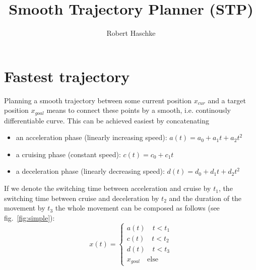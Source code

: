 \documentclass[11pt,english]{article}
\newcommand{\xc}{x_{cur}}
\newcommand{\xg}{x_{goal}}
\begin{document}
\title{Smooth Trajectory Planner (STP)}
\author{Robert Haschke}
\maketitle

\section{Fastest trajectory}
Planning a smooth trajectory between some current position $\xc$ and a target
position $\xg$ means to connect these points by a smooth, i.e. continously
differentiable curve. This can be achieved easiest by concatenating
\begin{itemize}\itemsep0pt
\item an acceleration phase (linearly increasing speed): 
  $a(t) = a_0 + a_1 t + a_2 t^2$
\item a cruising phase (constant speed): $c(t) = c_0 + c_1 t$
\item a deceleration phase (linearly decreasing speed):
  $d(t) = d_0 + d_1 t + d_2 t^2$
\end{itemize}
If we denote the switching time between acceleration and cruise by $t_1$, the
switching time between cruise and deceleration by $t_2$ and the duration of
the movement by $t_3$ the whole movement can be composed as follows (see
fig.~\ref{fig:simple}):
\begin{equation*}
  x(t) = \begin{cases}
    a(t) \quad t < t_1 \\
    c(t) \quad t < t_2 \\
    d(t) \quad t < t_3 \\
    \xg  \quad \text{else}
  \end{cases}
\end{equation*}
\end{document}
